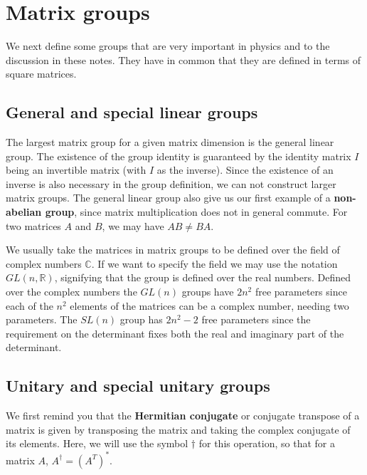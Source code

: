 \documentclass[notes.tex]{subfiles}
\begin{document}
\section{Matrix groups}
\label{sec:matrix_groups}
We next define some groups that are very important in physics and to the discussion in these notes. They have in common that they are defined in terms of square matrices.

\subsection{General and special linear groups}
The largest matrix group for a given matrix dimension is the general linear group.
The existence of the group identity is guaranteed by the identity matrix $I$ being an invertible matrix (with $I$ as the inverse). Since the existence of an inverse is also necessary in the group definition, we can not construct larger matrix groups. The general linear group also give us our first example of a {\bf non-abelian group}, since matrix multiplication does not in general commute. For two matrices $A$ and $B$, we may have $AB\ne BA$.

We usually take the matrices in matrix groups to be defined over the field of complex numbers $\mathbb{C}$. If we want to specify the field we may use the notation $GL(n, \mathbb{R})$, signifying that the group is defined over the real numbers. Defined over the complex numbers the $GL(n)$ groups have $2n^2$ free parameters since each of the $n^2$ elements of the matrices can be a complex number, needing two parameters. The $SL(n)$ group has $2n^2-2$ free parameters since the requirement on the determinant fixes both the real and imaginary part of the determinant.

\subsection{Unitary and special unitary groups}
We first remind you that the {\bf Hermitian conjugate} or conjugate transpose of a matrix is given by transposing the matrix and taking the complex conjugate of its elements. Here, we will use the symbol $\dagger$ for this operation, so that for a matrix $A$, $A^\dagger=(A^T)^*$.
\end{document}
